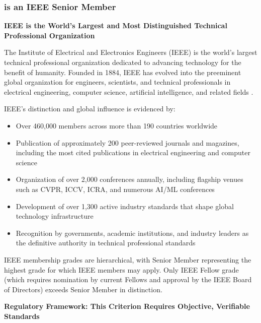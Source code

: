 

\subsubsection{\dr is an IEEE Senior Member}
\label{member:ieee}

\textbf{IEEE is the World's Largest and Most Distinguished Technical Professional Organization}

The Institute of Electrical and Electronics Engineers (IEEE) is the world's largest technical professional organization dedicated to advancing technology for the benefit of humanity. Founded in 1884, IEEE has evolved into the preeminent global organization for engineers, scientists, and technical professionals in electrical engineering, computer science, artificial intelligence, and related fields \cite{ieeehistory}.

IEEE's distinction and global influence is evidenced by:
\begin{itemize}
    \item Over 460,000 members across more than 190 countries worldwide
    \item Publication of approximately 200 peer-reviewed journals and magazines, including the most cited publications in electrical engineering and computer science
    \item Organization of over 2,000 conferences annually, including flagship venues such as CVPR, ICCV, ICRA, and numerous AI/ML conferences
    \item Development of over 1,300 active industry standards that shape global technology infrastructure
    \item Recognition by governments, academic institutions, and industry leaders as the definitive authority in technical professional standards
\end{itemize}

IEEE membership grades are hierarchical, with Senior Member representing the highest grade for which IEEE members may apply. Only IEEE Fellow grade (which requires nomination by current Fellows and approval by the IEEE Board of Directors) exceeds Senior Member in distinction.

\textbf{Regulatory Framework: This Criterion Requires Objective, Verifiable Standards}

